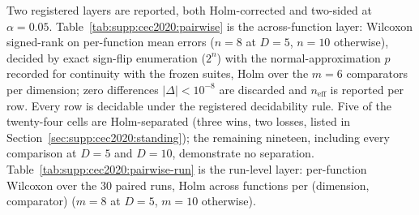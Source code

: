 \documentclass[algorithms,article,submit,moreauthors,pdftex]{Definitions/mdpi}
\begin{document}
Two registered layers are reported, both Holm-corrected and two-sided at
$\alpha = 0.05$.  Table~\ref{tab:supp:cec2020:pairwise} is the
across-function layer: Wilcoxon signed-rank on per-function mean errors
($n = 8$ at $D = 5$, $n = 10$ otherwise), decided by exact sign-flip
enumeration ($2^{n}$) with the normal-approximation $p$ recorded for
continuity with the frozen suites, Holm over the $m = 6$ comparators per
dimension; zero differences $|\Delta| < 10^{-8}$ are discarded and
$n_{\mathrm{eff}}$ is reported per row.  Every row is decidable under
the registered decidability rule.  Five of the twenty-four cells are
Holm-separated (three wins, two losses, listed in
Section~\ref{sec:supp:cec2020:standing}); the remaining nineteen,
including every comparison at $D = 5$ and $D = 10$, demonstrate no
separation.  Table~\ref{tab:supp:cec2020:pairwise-run} is the run-level
layer: per-function Wilcoxon over the 30 paired runs, Holm across
functions per (dimension, comparator) ($m = 8$ at $D = 5$, $m = 10$
otherwise).
\end{document}
